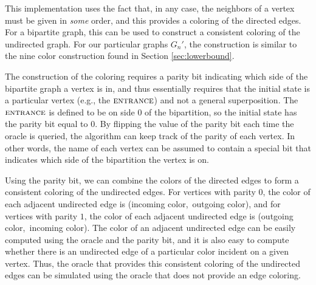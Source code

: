 \documentclass[aps,11pt,twoside,nofootinbib,tightenlines,superscriptaddress,preprintnumbers]{revtex4}
\newcommand{\<}{\langle}
\renewcommand{\>}{\rangle}
\newcommand{\ent}{{\textsc{entrance}}}
\begin{document}
This implementation uses the fact that, in any case, the neighbors of a
vertex must be given in {\it some} order, and this provides a coloring of
the directed edges. For a bipartite graph, this can be used to construct a
consistent coloring of the undirected graph.  For our particular graphs
$G_n'$, the construction is similar to the nine color construction found
in Section \ref{sec:lowerbound}.

The construction of the coloring requires a parity bit indicating which
side of the bipartite graph a vertex is in, and thus essentially requires
that the initial state is a particular vertex (e.g., the $\ent$) and not a
general superposition.  The $\ent$ is defined to be on side $0$ of the
bipartition, so the initial state has the parity bit equal to $0$.  By
flipping the value of the parity bit each time the oracle is queried, the
algorithm can keep track of the parity of each vertex.  In other words,
the name of each vertex can be assumed to contain a special bit that
indicates which side of the bipartition the vertex is on.

Using the parity bit, we can combine the colors of the directed edges to
form a consistent coloring of the undirected edges.  For vertices with
parity $0$, the color of each adjacent undirected edge is (incoming
color,~outgoing color), and for vertices with parity $1$, the color of
each adjacent undirected edge is (outgoing color,~incoming color).  The
color of an adjacent undirected edge can be easily computed using the
oracle and the parity bit, and it is also easy to compute whether there is
an undirected edge of a particular color incident on a given vertex.
Thus, the oracle that provides this consistent coloring of the undirected
edges can be simulated using the oracle that does not provide an edge
coloring.

\end{document}
